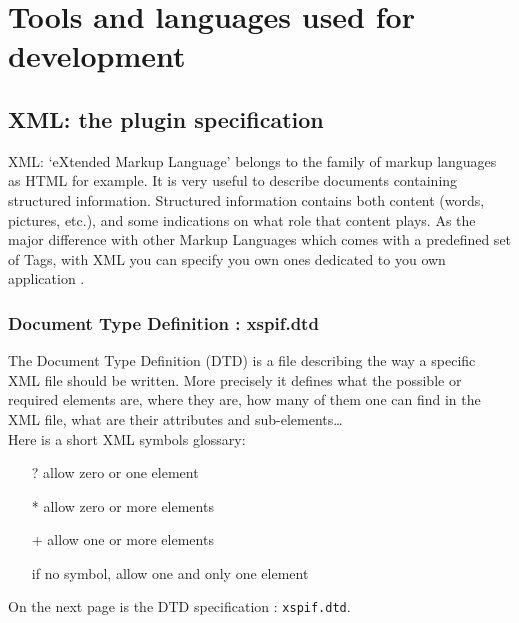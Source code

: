 
\chapter{Tools and languages used for development}

\section{XML: the plugin specification}

\noindent XML: `eXtended Markup Language' belongs to the family of
markup languages as HTML for example. It is very useful to describe
documents containing structured information. Structured information
contains both content (words, pictures, etc.), and some indications on
what role that content plays. As the major difference with other
Markup Languages which comes with a predefined set of Tags, with XML
you can specify you own ones dedicated to you own application \cite{Walsh}. 

\subsection{Document Type Definition : xspif.dtd}\label{chap2_dtd}
\noindent The Document Type Definition (DTD) is a file describing the way a specific XML file should be written. More precisely it defines what the possible or required elements are, where they are, how many of them one can find in the XML file, what are their attributes and sub-elements\ldots\\

\noindent Here is a short XML symbols glossary:
\begin{itemize}
\item[?]  allow zero or one element
\item[*]  allow zero or more elements
\item[+]  allow one or more elements
\item[] if no symbol, allow one and only one element
\end{itemize}


\noindent On the next page is the DTD specification : \verb|xspif.dtd|.
\pagebreak


